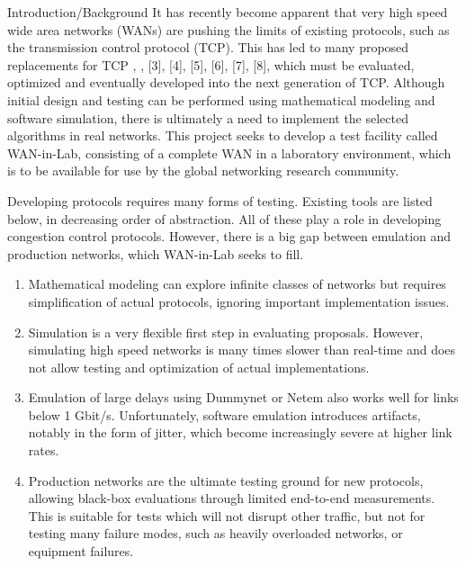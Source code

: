 \documentclass{IEEEtran}
\begin{document}
\begin{section}{Introduction/Background}
It has recently become apparent that very high speed wide area
networks (WANs) are pushing the limits of existing protocols, such
as the transmission control protocol (TCP). This has led to many
proposed replacements for TCP \cite{FAST-NW}, \cite{FAST-INFOCOM}, [3], [4], [5], [6],
[7], [8], which must be evaluated, optimized and eventually developed
into the next generation of TCP. Although initial design and testing
can be performed using mathematical modeling and software simulation,
there is ultimately a need to implement the selected algorithms in real
networks. This project seeks to develop a test facility called WAN-in-Lab,
consisting of a complete WAN in a laboratory environment, which is to
be available for use by the global networking research community.

Developing protocols requires many forms of testing. Existing tools are
listed below, in decreasing order of abstraction. All of these play a role
in developing congestion control protocols. However, there is a big gap
between emulation and production networks, which WAN-in-Lab seeks to fill.

\begin{enumerate}
\item Mathematical modeling can explore infinite classes of networks
but  requires simplification of actual protocols, ignoring important
implementation issues.

\item Simulation is a very flexible first step in evaluating
proposals. However, simulating high speed networks is many times slower
than real-time and does not allow testing and optimization of actual
implementations.

\item Emulation of large delays using Dummynet or Netem also works well
for links below 1 Gbit/s. Unfortunately, software emulation introduces
artifacts, notably in the form of jitter, which become increasingly
severe at higher link rates.

\item Production networks are the ultimate testing ground for new
protocols, allowing black-box evaluations through limited end-to-end
measurements. This is suitable for tests which will not disrupt other
traffic, but not for testing many failure modes, such as heavily
overloaded networks, or equipment failures.
\end{enumerate}

\end{section}
\end{document}
